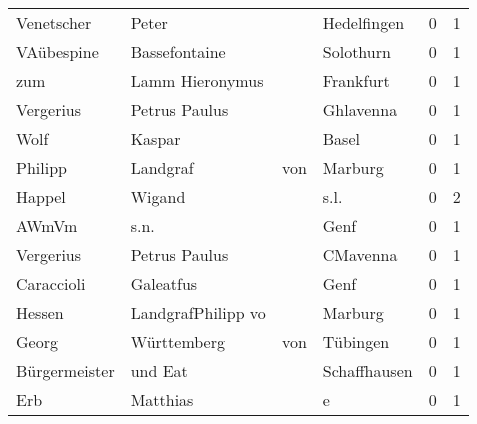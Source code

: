 \begin{tabular}{llllrr}
               Venetscher &                              Peter &             &                                 Hedelfingen &          0 &         1 \\
               VAübespine &                      Bassefontaine &             &                                   Solothurn &          0 &         1 \\
                      zum &                    Lamm Hieronymus &             &                                   Frankfurt &          0 &         1 \\
                Vergerius &                      Petrus Paulus &             &                                   Ghlavenna &          0 &         1 \\
                     Wolf &                             Kaspar &             &                                       Basel &          0 &         1 \\
                  Philipp &                           Landgraf &         von &                                     Marburg &          0 &         1 \\
                   Happel &                             Wigand &             &                                        s.l. &          0 &         2 \\
                    AWmVm &                               s.n. &             &                                        Genf &          0 &         1 \\
                Vergerius &                      Petrus Paulus &             &                                    CMavenna &          0 &         1 \\
               Caraccioli &                          Galeatfus &             &                                        Genf &          0 &         1 \\
                   Hessen &                 LandgrafPhilipp vo &             &                                     Marburg &          0 &         1 \\
                    Georg &                        Württemberg &         von &                                    Tübingen &          0 &         1 \\
            Bürgermeister &                            und Eat &             &                                Schaffhausen &          0 &         1 \\
                      Erb &                           Matthias &             &                                           e &          0 &         1 \\

\end{tabular}

